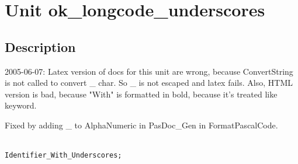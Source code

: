\documentclass{report}
\begin{document}
\label{toc}\tableofcontents
\newpage
\newlength{\tmplength}
\chapter{Unit ok{\_}longcode{\_}underscores}
\label{ok_longcode_underscores}
\section{Description}
2005{-}06{-}07: Latex version of docs for this unit are wrong, because ConvertString is not called to convert {\_} char. So {\_} is not escaped and latex fails. Also, HTML version is bad, because "With" is formatted in bold, because it's treated like keyword.

Fixed by adding {\_} to AlphaNumeric in PasDoc{\_}Gen in FormatPascalCode.

\texttt{\\\nopagebreak[3]
Identifier{\_}With{\_}Underscores;\\
}
\end{document}
